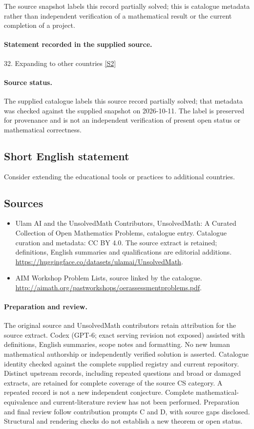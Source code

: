 \documentclass[11pt]{article}
\begin{document}
The source snapshot labels this record partially solved; this is catalogue metadata rather than independent verification of a mathematical result or the current completion of a project.
\paragraph{Statement recorded in the supplied source.}
32. Expanding to other countries \href{http://aimath.org/pastworkshops/oerassessmentproblems.pdf}{[S2]}
\paragraph{Source status.}
The supplied catalogue labels this source record partially solved; that metadata was checked against the supplied snapshot on 2026-10-11. The label is preserved for provenance and is not an independent verification of present open status or mathematical correctness.
\subsection{Short English statement}
Consider extending the educational tools or practices to additional countries.
\subsection{Sources}
\begin{itemize}
\item[S1] Ulam AI and the UnsolvedMath Contributors, UnsolvedMath: A Curated Collection of Open Mathematics Problems, catalogue entry. Catalogue curation and metadata: CC BY 4.0. The source extract is retained; definitions, English summaries and qualifications are editorial additions.
\url{https://huggingface.co/datasets/ulamai/UnsolvedMath}.
\item[S2] AIM Workshop Problem Lists, source linked by the catalogue.
\url{http://aimath.org/pastworkshops/oerassessmentproblems.pdf}.
\end{itemize}
\paragraph{Preparation and review.}
The original source and UnsolvedMath contributors retain attribution for the source extract. Codex (GPT-6; exact serving revision not exposed) assisted with definitions, English summaries, scope notes and formatting. No new human mathematical authorship or independently verified solution is asserted. Catalogue identity checked against the complete supplied registry and current repository. Distinct upstream records, including repeated questions and broad or damaged extracts, are retained for complete coverage of the source CS category. A repeated record is not a new independent conjecture. Complete mathematical-equivalence and current-literature review has not been performed. Preparation and final review follow contribution prompts C and D, with source gaps disclosed. Structural and rendering checks do not establish a new theorem or open status.
\label{end:statement}
\end{document}
